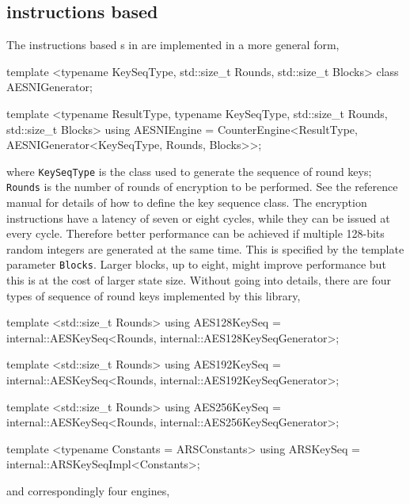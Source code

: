 \subsection{\protect\aesni instructions based \protect\rng}
\label{sub:AES-NI instructions based RNG}

The \aesni instructions based \rng{}s in \textcite{Salmon:2011um} are
implemented in a more general form,
\begin{cppcode}
  template <typename KeySeqType, std::size_t Rounds, std::size_t Blocks>
  class AESNIGenerator;

  template <typename ResultType, typename KeySeqType, std::size_t Rounds,
      std::size_t Blocks>
  using AESNIEngine =
      CounterEngine<ResultType, AESNIGenerator<KeySeqType, Rounds, Blocks>>;
\end{cppcode}
where \verb|KeySeqType| is the class used to generate the sequence of round
keys; \verb|Rounds| is the number of rounds of \aes encryption to be performed.
See the reference manual for details of how to define the key sequence class.
The \aesni encryption instructions have a latency of seven or eight cycles,
while they can be issued at every cycle. Therefore better performance can be
achieved if multiple 128-bits random integers are generated at the same time.
This is specified by the template parameter \verb|Blocks|. Larger blocks, up to
eight, might improve performance but this is at the cost of larger state size.
Without going into details, there are four types of sequence of round keys
implemented by this library,
\begin{cppcode}
  template <std::size_t Rounds>
  using AES128KeySeq =
      internal::AESKeySeq<Rounds, internal::AES128KeySeqGenerator>;
  
  template <std::size_t Rounds>
  using AES192KeySeq =
      internal::AESKeySeq<Rounds, internal::AES192KeySeqGenerator>;
  
  template <std::size_t Rounds>
  using AES256KeySeq =
      internal::AESKeySeq<Rounds, internal::AES256KeySeqGenerator>;
  
  template <typename Constants = ARSConstants>
  using ARSKeySeq = internal::ARSKeySeqImpl<Constants>;
\end{cppcode}
and correspondingly four \rng engines,
